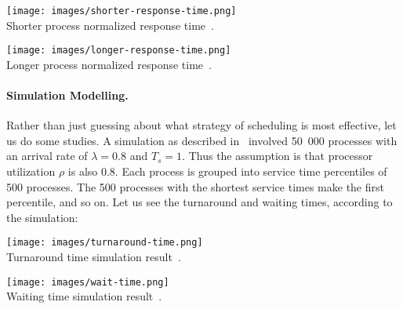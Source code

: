 \vspace{-2em}

\begin{center}
	\texttt{[image: images/shorter-response-time.png]}\\
	Shorter process normalized response time~\cite{osi}.
\end{center}

\vspace{-2em}

\begin{center}
	\texttt{[image: images/longer-response-time.png]}\\
	Longer process normalized response time~\cite{osi}.
\end{center}

\paragraph{Simulation Modelling.} Rather than just guessing about what strategy of scheduling is most effective, let us do some studies. A simulation as described in~\cite{fink} involved 50~000 processes with an arrival rate of $\lambda = 0.8$ and $T_{s} = 1$. Thus the assumption is that processor utilization $\rho$ is also 0.8. Each process is grouped into service time percentiles of 500 processes. The 500 processes with the shortest service times make the first percentile, and so on. Let us see the turnaround and waiting times, according to the simulation:

\begin{center}
	\texttt{[image: images/turnaround-time.png]}\\
	Turnaround time simulation result~\cite{osi}.
\end{center}

\begin{center}
	\texttt{[image: images/wait-time.png]}\\
	Waiting time simulation result~\cite{osi}.
\end{center}




